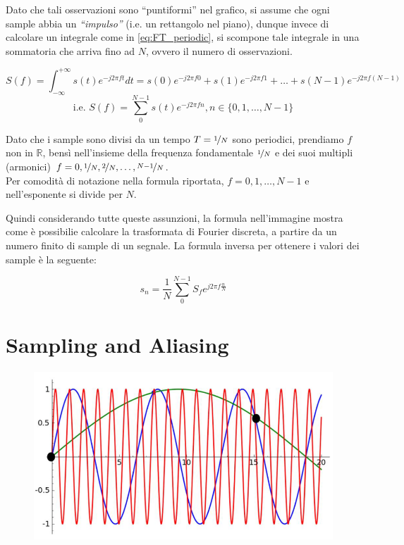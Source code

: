 Dato che tali osservazioni sono ``puntiformi'' nel grafico, si assume  che ogni sample abbia un \textit{``impulso''} (i.e. un rettangolo nel piano), dunque invece di calcolare un integrale come in \ref{eq:FT_periodic}, si scompone tale integrale in una sommatoria che arriva fino ad $N$, ovvero il numero di osservazioni.

\[ S(f) = \int_{-\infty}^{+\infty}s(t) e^{- j 2 \pi f t}dt = s(0) e^{- j 2 \pi f 0} + s(1) e^{- j 2 \pi f 1} + \ldots + s(N-1) e^{- j 2 \pi f (N-1)}\]
\[ \text{i.e. }S(f) = \sum_{0}^{N-1}s(t) e^{- j 2 \pi f n}, n \in \{0, 1, \ldots, N-1\}\]

Dato che i sample sono divisi da un tempo $T=\nicefrac{1}{N}$ sono periodici, prendiamo $f$ non in $\mathbb{R}$, bensì nell'insieme della frequenza fondamentale $\nicefrac{1}{N}$ e dei suoi multipli (armonici) $f = 0,\nicefrac{1}{N},\nicefrac{2}{N},\dots,\nicefrac{N-1}{N}$.\\
Per comodità di notazione nella formula riportata, $f=0,1,\dots,N-1$ e nell'esponente si divide per $N$.

Quindi considerando tutte queste assunzioni, la formula nell'immagine mostra come è possibilie calcolare la trasformata di Fourier discreta, a partire da un numero finito di sample di un segnale. La formula inversa per ottenere i valori dei sample è la seguente:

\[ s_n = \frac{1}{N} \sum_{0}^{N-1} S_f e^{j 2 \pi f \frac{n}{N}}\]

\section{Sampling and Aliasing}
\begin{figure}[htbp]
    \centering
    \includegraphics{images/questions/sampling_aliasing.png}
    \label{fig:sampling_aliasing}
\end{figure}

